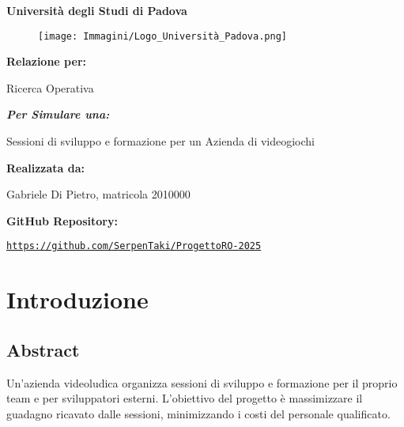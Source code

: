 \documentclass[12pt]{article}
\renewcommand{\familydefault}{\rmdefault} %
\begin{document}
\begin{titlepage}
    \centering
    {\Huge \textbf{Università degli Studi di Padova} \par}
    \vspace{1cm}
    \begin{figure}[h!]
        \centering
        \texttt{[image: Immagini/Logo\_Università\_Padova.png]}
    \end{figure}
    \vspace{0.5cm}
    {\LARGE \textbf{Relazione per:} \par}
    {\Huge Ricerca Operativa \par}
    \vspace{0.5cm}
    {\Large \textit{\textbf{Per Simulare una:}} \par}
    {\Large Sessioni di sviluppo e formazione per un Azienda di videogiochi \par}
    \vfill
    \textbf{Realizzata da:} \par
    Gabriele Di Pietro, matricola 2010000 \par
    \vspace{0.5cm}
    \textbf{GitHub Repository:} \par
    \texttt{\url{https://github.com/SerpenTaki/ProgettoRO-2025}}
\end{titlepage}
    \renewcommand{\familydefault}{\sfdefault} %
    \fontsize{10}{12}\selectfont
    \newpage
    \section{Introduzione}
    \subsection{Abstract}
    Un'azienda videoludica organizza sessioni di sviluppo e formazione per il proprio team e per sviluppatori esterni. L'obiettivo del progetto è massimizzare il guadagno ricavato dalle sessioni, minimizzando i costi del personale qualificato.
\end{document}
